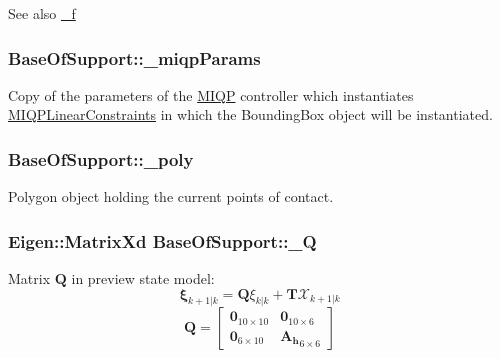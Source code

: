 \begin{DoxySeeAlso}{\-See also}
\hyperlink{classBaseOfSupport_aa2d0af7272d153ead5e088ff67c981e8}{\-\_\-f} 
\end{DoxySeeAlso}
\hypertarget{classBaseOfSupport_a82f86511c236d038f1670dd515e53a8f}{
\subsubsection[{\-\_\-miqp\-Params}]{ {\bf \-Base\-Of\-Support\-::\-\_\-miqp\-Params}}}\label{classBaseOfSupport_a82f86511c236d038f1670dd515e53a8f}
\-Copy of the parameters of the \hyperlink{namespaceMIQP}{\-M\-I\-Q\-P} controller which instantiates \hyperlink{classMIQPLinearConstraints}{\-M\-I\-Q\-P\-Linear\-Constraints} in which the \-Bounding\-Box object will be instantiated. \hypertarget{classBaseOfSupport_a7e9b4ef515f90e2a7012871e7287bf5e}{
\subsubsection[{\-\_\-poly}]{ {\bf \-Base\-Of\-Support\-::\-\_\-poly}}}\label{classBaseOfSupport_a7e9b4ef515f90e2a7012871e7287bf5e}
\-Polygon object holding the current points of contact. \hypertarget{classBaseOfSupport_a22efc7f81862ffd1268b862ddb9d59ff}{
\subsubsection[{\-\_\-\-Q}]{\setlength{\rightskip}{0pt plus 5cm}\-Eigen\-::\-Matrix\-Xd {\bf \-Base\-Of\-Support\-::\-\_\-\-Q}}}\label{classBaseOfSupport_a22efc7f81862ffd1268b862ddb9d59ff}
\-Matrix $\mathbf{Q}$ in preview state model\-: \[ \mathbf{\xi}_{k+1|k} = \mathbf{Q} \xi_{k|k} + \mathbf{T}\mathcal{X}_{k+1|k} \] \[ \mathbf{Q} = \left[\begin{array}{cc} \mathbf{0}_{10\times10} & \mathbf{0}_{10\times6}\\ \mathbf{0}_{6\times10} & \mathbf{A_h}_{6\times6} \end{array}\right] \]

